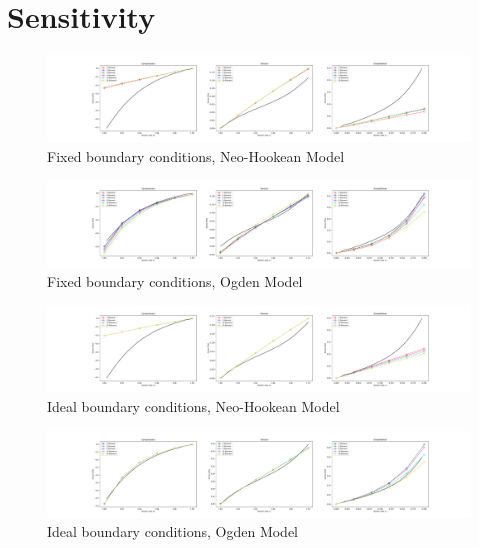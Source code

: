 \documentclass{article}
\begin{document}
\newpage

\section{Sensitivity}

\centering
\begin{figure}[h!]
\centering
\includegraphics[width=1\linewidth, trim= 250 0 250 0]{SensitivityFixedNeo-Hookean}
\caption{Fixed boundary conditions, Neo-Hookean Model}
\end{figure}

\begin{figure}[h!]
\centering
\includegraphics[width=\linewidth, trim= 250 0 250 0]{SensitivityFixedOgden}
\caption{Fixed boundary conditions, Ogden Model}
\end{figure}

\begin{figure}[h!]
\centering
\includegraphics[width=\linewidth, trim= 250 0 250 0]{SensitivityIdealNeo-Hookean}
\caption{Ideal boundary conditions, Neo-Hookean Model}
\end{figure}

\begin{figure}[h!]
\centering
\includegraphics[width=\linewidth, trim= 250 0 250 0]{SensitivityIdealOgden}
\caption{Ideal boundary conditions, Ogden Model}
\end{figure}
\end{document}

